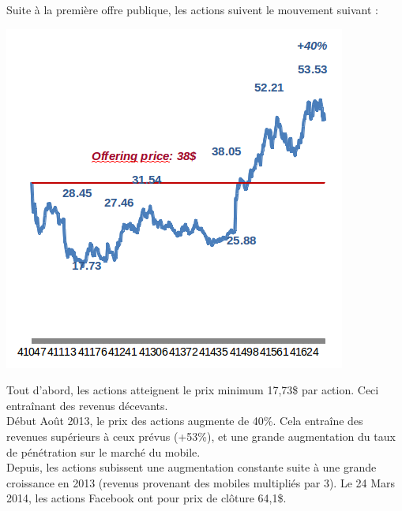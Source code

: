 \documentclass[a4paper,10pt]{article}
\begin{document}
Suite à la première offre publique, les actions suivent le mouvement suivant :
\begin{center}
\includegraphics[scale=0.4]{images/FBpostIPO.png}
\end{center}
Tout d'abord, les actions atteignent le prix minimum 17,73\$ par action. Ceci entraînant des revenus décevants.\\
Début Août 2013, le prix des actions augmente de 40\%. Cela entraîne des revenues supérieurs à ceux prévus (+53\%), et une grande augmentation du taux de pénétration sur le marché du mobile.\\
Depuis, les actions subissent une augmentation constante suite à une grande croissance en 2013 (revenus provenant des mobiles multipliés par 3). Le 24 Mars 2014, les actions Facebook ont pour prix de clôture 64,1\$.
\end{document}
